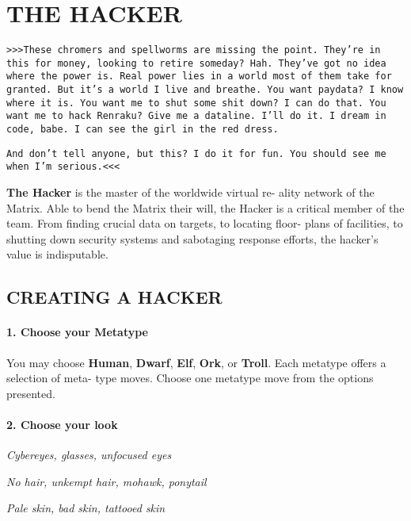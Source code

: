 
\section{THE HACKER}
\begin{multicols}{3}
\setlength{\parskip}{.05cm}

\texttt{>>>These chromers and spellworms are missing the point.
They’re in this for money, looking to retire someday? Hah.
They’ve got no idea where the power is. Real power lies in
a world most of them take for granted. But it’s a world I live
and breathe. You want paydata? I know where it is. You want
me to shut some shit down? I can do that. You want me to
hack Renraku? Give me a dataline. I’ll do it. I dream in code,
babe. I can see the girl in the red dress.}

\texttt{And don’t tell anyone, but this? I do it for fun. You should see
me when I’m serious.<<<}

\textbf{The Hacker} is the master of the worldwide virtual re-
ality network of the Matrix. Able to bend the Matrix
their will, the Hacker is a critical member of the team.
From finding crucial data on targets, to locating floor-
plans of facilities, to shutting down security systems
and sabotaging response efforts, the hacker’s value is
indisputable.


\subsection{CREATING A HACKER}

\paragraph{1.  Choose your Metatype}

You may choose \textbf{Human}, \textbf{Dwarf}, \textbf{Elf}, \textbf{Ork}, or
\textbf{Troll}. Each metatype offers a selection of meta-
type moves. Choose one metatype move from
the options presented.

\paragraph{2.  Choose your look}

\textit{Cybereyes, glasses, unfocused eyes}

\textit{No hair, unkempt hair, mohawk, ponytail}

\textit{Pale skin, bad skin, tattooed skin}


\end{multicols}
